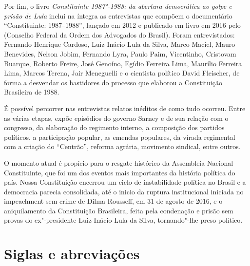 Por fim, o livro \emph{Constituinte 1987"-1988: da abertura democrática
ao golpe e prisão de Lula} inclui na íntegra as entrevistas
que compõem o documentário ``Constituinte: 1987--1988'', lançado em 2012 e
publicado em livro em 2016 pelo  (Conselho Federal da Ordem dos Advogados do
Brasil). Foram entrevistados: Fernando Henrique Cardoso, Luiz Inácio Lula da Silva, Marco
Maciel, Mauro Benevides, Nelson Jobim, Fernando Lyra, Paulo Paim, Vicentinho, Cristovam Buarque,
Roberto Freire, José Genoíno, Egídio Ferreira Lima, Maurílio Ferreira Lima, Marcos Terena, Jair
Meneguelli e o cientista político David Fleischer, de forma a desvendar os bastidores do
processo que elaborou a Constituição Brasileira de 1988.

É possível percorrer nas entrevistas relatos inéditos de como tudo ocorreu. Entre as várias
etapas, expõe episódios do governo Sarney e de sua relação com o congresso, da elaboração do
regimento interno, a composição dos partidos políticos, a participação popular, as emendas
populares, da virada regimental com a criação do “Centrão”, reforma agrária, movimento sindical,
entre outros.

O momento atual é propício para o resgate histórico da Assembleia Nacional Constituinte, que
foi um dos eventos mais importantes da história política do país. Nossa Constituição encerrou
um ciclo de instabilidade política no Brasil e a democracia parecia consolidada, até o inicio da
ruptura institucional iniciada no impeachment sem crime de Dilma Rousseff, em 31 de agosto de
2016, e o aniquilamento da Constituição Brasileira, feita pela condenação e prisão sem provas
do ex"-presidente Luiz Inácio Lula da Silva, tornando"-lhe preso político.

\section{Siglas e abreviações}

